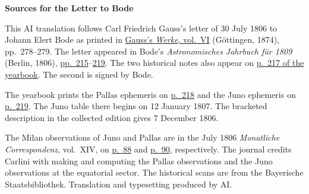 \clearpage\thispagestyle{empty}
\begin{center}\textbf{Sources for the Letter to Bode}\end{center}
\noindent This AI translation follows Carl Friedrich Gauss’s letter of 30 July 1806 to Johann Elert Bode as printed in \href{https://gdz.sub.uni-goettingen.de/id/PPN236007467}{Gauss’s \textit{Werke}, vol.~VI} (Göttingen, 1874), pp.~278--279. The letter appeared in Bode’s \textit{Astronomisches Jahrbuch für 1809} (Berlin, 1806), \href{https://www.digitale-sammlungen.de/en/view/bsb10538338?page=225}{pp.~215}--\href{https://www.digitale-sammlungen.de/en/view/bsb10538338?page=229}{219}. The two historical notes also appear on \href{https://www.digitale-sammlungen.de/en/view/bsb10538338?page=227}{p.~217 of the yearbook}. The second is signed by Bode.
\par\medskip
The yearbook prints the Pallas ephemeris on \href{https://www.digitale-sammlungen.de/en/view/bsb10538338?page=228}{p.~218} and the Juno ephemeris on \href{https://www.digitale-sammlungen.de/en/view/bsb10538338?page=229}{p.~219}. The Juno table there begins on 12 January 1807. The bracketed description in the collected edition gives 7 December 1806.
\par\medskip
The Milan observations of Juno and Pallas are in the July 1806 \textit{Monatliche Correspondenz}, vol.~XIV, on \href{https://www.digitale-sammlungen.de/en/view/bsb10538606?page=98}{p.~88} and \href{https://www.digitale-sammlungen.de/en/view/bsb10538606?page=100}{p.~90}, respectively. The journal credits Carlini with making and computing the Pallas observations and the Juno observations at the equatorial sector. The historical scans are from the Bayerische Staatsbibliothek. Translation and typesetting produced by AI.
\clearpage
